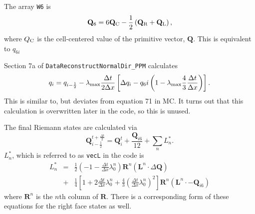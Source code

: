 \documentclass[preprint,11pt]{aastex}
\newcommand{\beq}{\begin{equation}}
\newcommand{\eeq}{\end{equation}}
\newcommand{\bea}{\begin{eqnarray}}
\newcommand{\eea}{\end{eqnarray}}
\begin{document}
The array \verb!W6! is
\beq
\mathbf{Q}_6 = 6 \mathbf{Q}_{\rm C} - \frac{1}{2} \left( \mathbf{Q}_{\rm R} + \mathbf{Q}_{\rm L} \right),
\eeq
where $Q_{\rm C}$ is the cell-centered value of the primitive vector, $\mathbf{Q}$.  This is equivalent to $q_{6i}$

Section 7a of \verb!DataReconstructNormalDir_PPM! calculates
\beq
q_i = q_{i-\frac{1}{2}} - \lambda_{\rm max} \frac{\Delta t}{2 \Delta x} \left[ \Delta q_i - q_6i \left( 1 - \lambda_{\rm max} \frac{4}{3} \frac{\Delta t}{\Delta x}  \right) \right].
\eeq
This is similar to, but deviates from equation 71 in MC.  It turns out that this calculation is overwritten later in the code, so this is unused.

The final Riemann states are calculated via 
\beq
\label{rstates}
\mathbf{Q}_{i-\frac{1}{2}}^{t+\frac{\Delta t}{2}} = \mathbf{Q}_{i}^{t} + \frac{\mathbf{Q}_{i6}}{12} + \sum\limits_n L^*_n.
\eeq
$L^*_n$, which is referred to as \verb!vecL! in the code is
\bea
L^*_n &=& \frac{1}{2} \left( -1 - \frac{\Delta t}{\Delta x} \lambda_{0}^n \right) \mathbf{R}^n \left( \mathbf{L}^n \cdot \Delta \mathbf{Q} \right) \nonumber \\
&+& \frac{1}{4} \left[ 1 + 2 \frac{\Delta t}{\Delta x} \lambda_{0}^n  + \frac{4}{3} \left( \frac{\Delta t}{\Delta x} \lambda_0^n \right)^2 \right] \mathbf{R}^n \left( \mathbf{L}^n \cdot - \mathbf{Q}_{i6} \right)
\eea
where $\mathbf{R}^n$ is the $n$th column of $\mathbf{R}$.  There is a corresponding form of these equations for the right face states as well.
\end{document}
